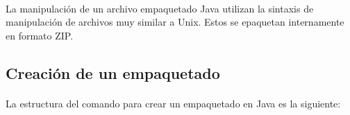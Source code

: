 \documentclass{article}
\begin{document}
	\paragraph{}La manipulación de un archivo empaquetado Java utilizan la sintaxis de manipulación de archivos muy similar a Unix. Estos se epaquetan internamente en formato ZIP.
	
	\subsection{Creación de un empaquetado}
	
	\paragraph{}La estructura del comando para crear un empaquetado en Java es la siguiente:
	
	\begin{centering}
		\texttt{}
	\end{centering}
	
\end{document}
